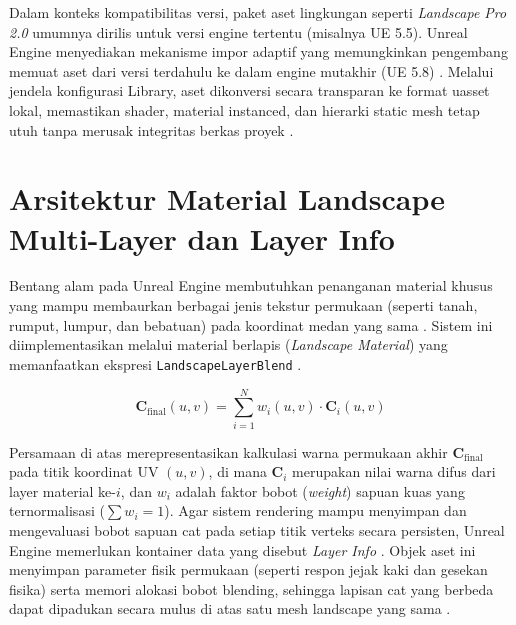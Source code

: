 \documentclass[a4paper,oneside,12pt]{report}
\begin{document}
Dalam konteks kompatibilitas versi, paket aset lingkungan seperti \textit{Landscape Pro 2.0} umumnya dirilis untuk versi engine tertentu (misalnya UE 5.5). Unreal Engine menyediakan mekanisme impor adaptif yang memungkinkan pengembang memuat aset dari versi terdahulu ke dalam engine mutakhir (UE 5.8) \cite{modul7}. Melalui jendela konfigurasi Library, aset dikonversi secara transparan ke format uasset lokal, memastikan shader, material instanced, dan hierarki static mesh tetap utuh tanpa merusak integritas berkas proyek \cite{modul7}.

\section{Arsitektur Material Landscape Multi-Layer dan Layer Info}
Bentang alam pada Unreal Engine membutuhkan penanganan material khusus yang mampu membaurkan berbagai jenis tekstur permukaan (seperti tanah, rumput, lumpur, dan bebatuan) pada koordinat medan yang sama \cite{epic-landscape-materials}. Sistem ini diimplementasikan melalui material berlapis (\textit{Landscape Material}) yang memanfaatkan ekspresi \texttt{Landscape}\allowbreak\texttt{LayerBlend} \cite{epic-landscape-materials}.

\begin{equation}
	\mathbf{C}_{\text{final}}(u,v) = \sum_{i=1}^{N} w_i(u,v) \cdot \mathbf{C}_i(u,v)
\end{equation}

Persamaan di atas merepresentasikan kalkulasi warna permukaan akhir $\mathbf{C}_{\text{final}}$ pada titik koordinat UV $(u,v)$, di mana $\mathbf{C}_i$ merupakan nilai warna difus dari layer material ke-$i$, dan $w_i$ adalah faktor bobot (\textit{weight}) sapuan kuas yang ternormalisasi ($\sum w_i = 1$). Agar sistem rendering mampu menyimpan dan mengevaluasi bobot sapuan cat pada setiap titik verteks secara persisten, Unreal Engine memerlukan kontainer data yang disebut \textit{Layer Info} \cite{modul7}. Objek aset ini menyimpan parameter fisik permukaan (seperti respon jejak kaki dan gesekan fisika) serta memori alokasi bobot blending, sehingga lapisan cat yang berbeda dapat dipadukan secara mulus di atas satu mesh landscape yang sama \cite{epic-landscape-materials}.
\end{document}

